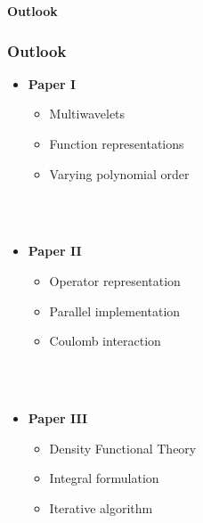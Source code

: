 \begin{frame}
    \centering
    \textbf{\Large{Outlook}}
\end{frame}

\begin{frame}
    \frametitle{Outlook}
    \begin{itemize}
        \item   \textbf{Paper I}
        \begin{itemize}
            \item   Multiwavelets
            \item   Function representations
            \item   Varying polynomial order
        \end{itemize}
        \ \\
        \ \\
        \item   \textbf{Paper II}
        \begin{itemize}
            \item   Operator representation
            \item   Parallel implementation
            \item   Coulomb interaction
        \end{itemize}
        \ \\
        \ \\
        \item   \textbf{Paper III}
        \begin{itemize}
            \item   Density Functional Theory
            \item   Integral formulation
            \item   Iterative algorithm
        \end{itemize}
    \end{itemize}
\end{frame}
